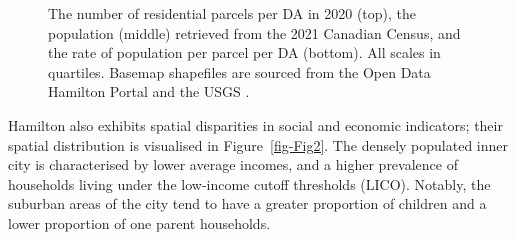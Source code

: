 \documentclass[
  authoryear,
  preprint,
  3p]{elsarticle}
\begin{document}
\begin{figure}


\caption{\label{fig-Fig1}The number of residential parcels per DA in
2020 (top), the population (middle) retrieved from the 2021 Canadian
Census, and the rate of population per parcel per DA (bottom). All
scales in quartiles. Basemap shapefiles are sourced from the Open Data
Hamilton Portal \citep{opendatahamiltonCityBoundary2023} and the USGS
\citep{greatlakesUSGS2010}.}

\end{figure}%

Hamilton also exhibits spatial disparities in social and economic
indicators; their spatial distribution is visualised in
Figure~\ref{fig-Fig2}. The densely populated inner city is characterised
by lower average incomes, and a higher prevalence of households living
under the low-income cutoff thresholds (LICO). Notably, the suburban
areas of the city tend to have a greater proportion of children and a
lower proportion of one parent households.
\end{document}
